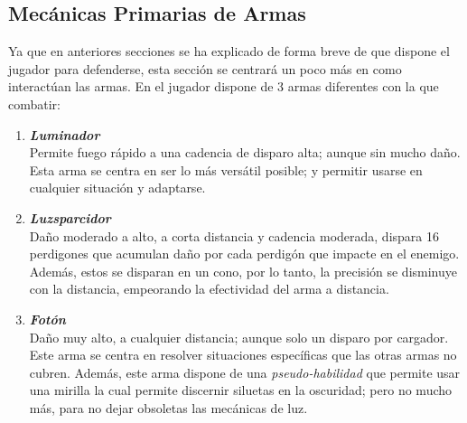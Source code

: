     \subsection{Mecánicas Primarias de Armas}
        Ya que en anteriores secciones se ha explicado de forma breve de que dispone el jugador para defenderse, esta sección se centrará un poco más en como interactúan las armas.
        En \gameTitle el jugador dispone de 3 armas diferentes con la que combatir:
            \begin{enumerate}
                \item \textbf{\textit{Luminador}} \\
                Permite fuego rápido a una cadencia de disparo alta; aunque sin mucho daño. Esta arma se centra en ser lo más versátil posible; y permitir usarse en cualquier situación y adaptarse.
                \item \textbf{\textit{Luzsparcidor}} \\
                Daño moderado a alto, a corta distancia y cadencia moderada, dispara 16 perdigones que acumulan daño por cada perdigón que impacte en el enemigo. Además, estos se disparan en un cono, por lo tanto, la precisión se disminuye con la distancia, empeorando la efectividad del arma a distancia.
                \item \textbf{\textit{Fotón}} \\
                Daño muy alto, a cualquier distancia; aunque solo un disparo por cargador. Este arma se centra en resolver situaciones específicas que las otras armas no cubren. Además, este arma dispone de una \textit{pseudo-habilidad} que permite usar una mirilla la cual permite discernir siluetas en la oscuridad; pero no mucho más, para no dejar obsoletas las mecánicas de luz.
            \end{enumerate}

